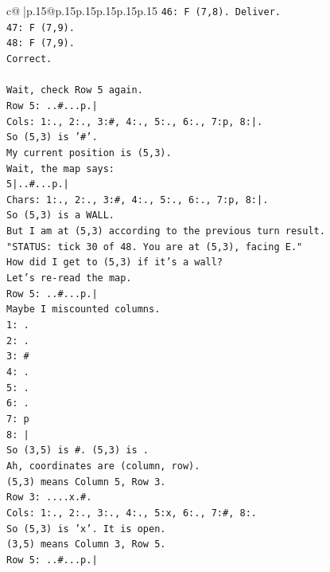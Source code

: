 \documentclass{article}
\begin{document}
{\begin{supertabular}{c@{$\;$}|p{.15\linewidth}@{}p{.15\linewidth}p{.15\linewidth}p{.15\linewidth}p{.15\linewidth}p{.15\linewidth}}
{{{\texttt{46: F (7,8). Deliver.} \\
\texttt{47: F (7,9).} \\
\texttt{48: F (7,9).} \\
\texttt{Correct.} \\
\\ 
\texttt{Wait, check Row 5 again.} \\
\texttt{Row 5: ..\#...p.|} \\
\texttt{Cols: 1:., 2:., 3:\#, 4:., 5:., 6:., 7:p, 8:|.} \\
\texttt{So (5,3) is '\#'.} \\
\texttt{My current position is (5,3).} \\
\texttt{Wait, the map says:} \\
\texttt{5|..\#...p.|} \\
\texttt{Chars: 1:., 2:., 3:\#, 4:., 5:., 6:., 7:p, 8:|.} \\
\texttt{So (5,3) is a WALL.} \\
\texttt{But I am at (5,3) according to the previous turn result.} \\
\texttt{"STATUS: tick 30 of 48. You are at (5,3), facing E."} \\
\texttt{How did I get to (5,3) if it's a wall?} \\
\texttt{Let's re{-}read the map.} \\
\texttt{Row 5: ..\#...p.|} \\
\texttt{Maybe I miscounted columns.} \\
\texttt{1: .} \\
\texttt{2: .} \\
\texttt{3: \#} \\
\texttt{4: .} \\
\texttt{5: .} \\
\texttt{6: .} \\
\texttt{7: p} \\
\texttt{8: |} \\
\texttt{So (3,5) is \#. (5,3) is .} \\
\texttt{Ah, coordinates are (column, row).} \\
\texttt{(5,3) means Column 5, Row 3.} \\
\texttt{Row 3: ....x.\#.} \\
\texttt{Cols: 1:., 2:., 3:., 4:., 5:x, 6:., 7:\#, 8:.} \\
\texttt{So (5,3) is 'x'. It is open.} \\
\texttt{(3,5) means Column 3, Row 5.} \\
\texttt{Row 5: ..\#...p.|} \\
}}}
\end{supertabular}}
\end{document}
